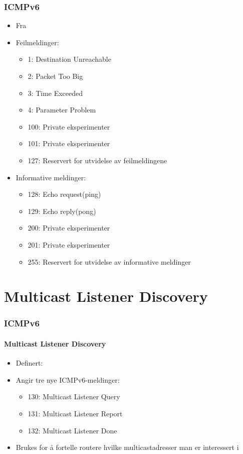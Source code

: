\begin{frame}%
  \frametitle{ICMPv6}
  \begin{itemize}%
  \item Fra 
  \item Feilmeldinger:
    \begin{itemize}%
    \item 1: Destination Unreachable
    \item 2: Packet Too Big
    \item 3: Time Exceeded
    \item 4: Parameter Problem
    \item 100: Private eksperimenter
    \item 101: Private eksperimenter
    \item 127: Reservert for utvidelse av feilmeldingene
    \end{itemize}
  \item Informative meldinger:
    \begin{itemize}%
    \item 128: Echo request\hfill(ping)
    \item 129: Echo reply\hfill(pong)
    \item 200: Private eksperimenter
    \item 201: Private eksperimenter
    \item 255: Reservert for utvidelse av informative meldinger
    \end{itemize}
  \end{itemize}
\end{frame}

\section{Multicast Listener Discovery}
\begin{frame}%
  \frametitle{ICMPv6}
  \framesubtitle{Multicast Listener Discovery}
  \begin{itemize}%
  \item Definert: 
  \item Angir tre nye ICMPv6-meldinger:
    \begin{itemize}%
    \item 130: Multicast Listener Query
    \item 131: Multicast Listener Report
    \item 132: Multicast Listener Done
    \end{itemize}
  \item Brukes for å fortelle routere hvilke multicastadresser man er
    interessert i
  \end{itemize}
\end{frame}

